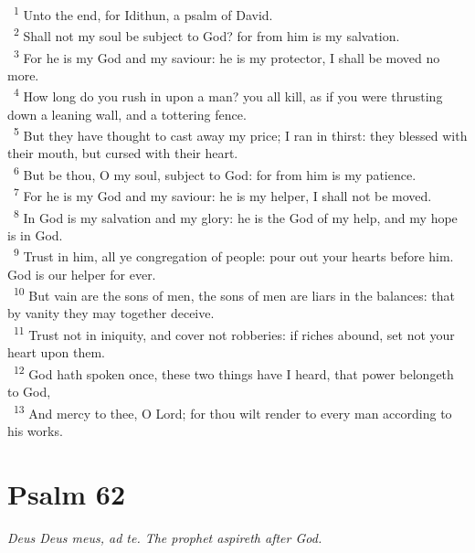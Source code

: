 \documentclass[a5paper,12pt]{article}
\begin{document}
\begin{multicols*}{2}
~\textsuperscript{1} Unto the end, for Idithun, a psalm of David.\\
~\textsuperscript{2} Shall not my soul be subject to God? for from him is my salvation.\\
~\textsuperscript{3} For he is my God and my saviour: he is my protector, I shall be moved no more.\\
~\textsuperscript{4} How long do you rush in upon a man? you all kill, as if you were thrusting down a leaning wall, and a tottering fence.\\
~\textsuperscript{5} But they have thought to cast away my price; I ran in thirst: they blessed with their mouth, but cursed with their heart.\\
~\textsuperscript{6} But be thou, O my soul, subject to God: for from him is my patience.\\
~\textsuperscript{7} For he is my God and my saviour: he is my helper, I shall not be moved.\\
~\textsuperscript{8} In God is my salvation and my glory: he is the God of my help, and my hope is in God.\\
~\textsuperscript{9} Trust in him, all ye congregation of people: pour out your hearts before him. God is our helper for ever.\\
~\textsuperscript{10} But vain are the sons of men, the sons of men are liars in the balances: that by vanity they may together deceive.\\
~\textsuperscript{11} Trust not in iniquity, and cover not robberies: if riches abound, set not your heart upon them.\\
~\textsuperscript{12} God hath spoken once, these two things have I heard, that power belongeth to God,\\
~\textsuperscript{13} And mercy to thee, O Lord; for thou wilt render to every man according to his works.\\

\section{Psalm 62}
\label{sec:orgce71b82}
\emph{Deus Deus meus, ad te. The prophet aspireth after God.}\\


\end{multicols*}
\end{document}
